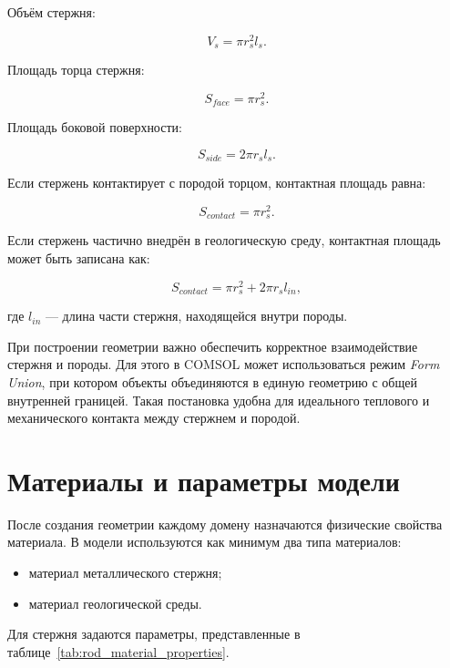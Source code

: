Объём стержня:

\begin{equation}
V_s=\pi r_s^2l_s.
\end{equation}

Площадь торца стержня:

\begin{equation}
S_{face}=\pi r_s^2.
\end{equation}

Площадь боковой поверхности:

\begin{equation}
S_{side}=2\pi r_sl_s.
\end{equation}

Если стержень контактирует с породой торцом, контактная площадь равна:

\begin{equation}
S_{contact}=\pi r_s^2.
\end{equation}

Если стержень частично внедрён в геологическую среду, контактная площадь может быть записана как:

\begin{equation}
S_{contact}=\pi r_s^2+2\pi r_sl_{in},
\end{equation}

где $l_{in}$ --- длина части стержня, находящейся внутри породы.

При построении геометрии важно обеспечить корректное взаимодействие стержня и породы. Для этого в COMSOL может использоваться режим \textit{Form Union}, при котором объекты объединяются в единую геометрию с общей внутренней границей. Такая постановка удобна для идеального теплового и механического контакта между стержнем и породой.

\section{Материалы и параметры модели}

После создания геометрии каждому домену назначаются физические свойства материала. В модели используются как минимум два типа материалов:

\begin{itemize}
    \item материал металлического стержня;
    \item материал геологической среды.
\end{itemize}

Для стержня задаются параметры, представленные в таблице~\ref{tab:rod_material_properties}.

